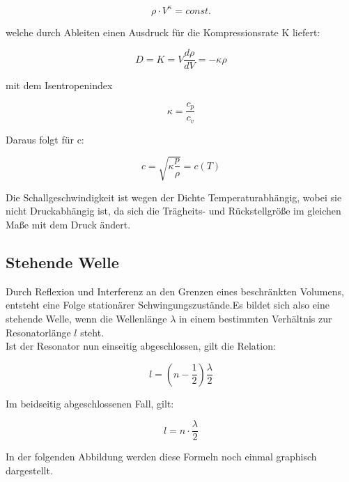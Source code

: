 \documentclass{article}
\begin{document}
{\begin{equation}
\label{rho}
\rho \cdot V^{\kappa} = const.
\end{equation}

welche durch Ableiten einen Ausdruck für die Kompressionsrate K liefert:

\begin{equation}
\label{K}
D = K = V \frac{d\rho}{dV}=-\kappa \rho
\end{equation}

mit dem Isentropenindex 

\begin{equation}
\label{kappa}
\kappa = \frac{c_{p}}{c_{v}}
\end{equation}

Daraus folgt für c:

\begin{equation}
c=\sqrt{\kappa\frac{p}{\rho}}=c(T)
\end{equation}

Die Schallgeschwindigkeit ist wegen der Dichte Temperaturabhängig, wobei sie nicht Druckabhängig ist, da sich die Trägheits- und Rückstellgröße im gleichen Maße mit dem Druck ändert.

\newpage
\subsection{Stehende Welle}
Durch Reflexion und Interferenz an den Grenzen eines beschränkten Volumens, entsteht eine Folge stationärer Schwingungszustände.Es bildet sich also eine stehende Welle, wenn die Wellenlänge \(\lambda\) in einem bestimmten Verhältnis zur Resonatorlänge \(l\) steht.\\
Ist der Resonator nun einseitig abgeschlossen, gilt die Relation:

\begin{equation}
\label{l1}
l=\left(n-\frac{1}{2}\right)\frac{\lambda}{2}
\end{equation}

Im beidseitig abgeschlossenen Fall, gilt:

\begin{equation}
l=n\cdot\frac{\lambda}{2}
\end{equation}

In der folgenden Abbildung werden diese Formeln noch einmal graphisch dargestellt.
{\begin{center}
\begin{minipage}{\linewidth}
\centering
\label{welle}
\end{minipage}
\end{center}

}}
\end{document}
